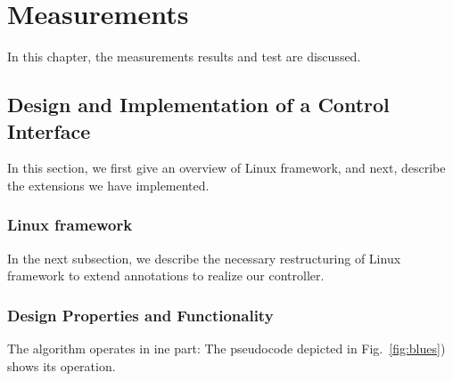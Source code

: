 \chapter{Measurements}
\label{chap:controller}

In this chapter, the measurements results and test are discussed.
%

\section{Design and Implementation of a Control Interface}
\label{sec:controller:design}

In this section, we first give an overview of Linux framework, and next, describe the extensions we have implemented.
%


\subsection{Linux framework}

In the next subsection, we describe the necessary restructuring of Linux framework to extend annotations to realize our controller.



\subsection{Design Properties and Functionality}
\label{sec:controller:functions}

The algorithm operates in ine part: The pseudocode depicted in Fig.~\ref{fig:blues}) shows its operation.

